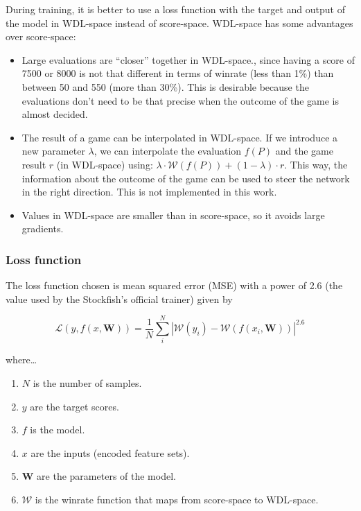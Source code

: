 During training, it is better to use a loss function with the target and output of the model in WDL-space instead of score-space. WDL-space has some advantages over score-space:

\begin{itemize}
\item Large evaluations are \enquote{closer} together in WDL-space., since having a score of 7500 or 8000 is not that different in terms of winrate (less than 1\%) than between 50 and 550 (more than 30\%). This is desirable because the evaluations don't need to be that precise when the outcome of the game is almost decided.
\item The result of a game can be interpolated in WDL-space. If we introduce a new parameter $\lambda$, we can interpolate the evaluation $f(P)$ and the game result $r$ (in WDL-space) using: $\lambda \cdot \mathcal{W}(f(P)) + (1 - \lambda) \cdot r$. This way, the information about the outcome of the game can be used to steer the network in the right direction. This is not implemented in this work.
\item Values in WDL-space are smaller than in score-space, so it avoids large gradients.
\end{itemize}




\subsubsection{Loss function}

The loss function chosen is mean squared error (MSE) with a power of 2.6 (the value used by the Stockfish's official trainer) given by


\[
\mathcal{L}(y,f(x,\bm{W}))= \frac{1}{N} \sum_i^N \left| \mathcal{W}(y_i) - \mathcal{W}(f(x_i,\bm{W})) \right| ^{2.6}
\]

where\dots

\begin{enumerate}
\itemsep0em
\item $N$ is the number of samples.
\item $y$ are the target scores.
\item $f$ is the model.
\item $x$ are the inputs (encoded feature sets).
\item $\bm{W}$ are the parameters of the model.
\item $\mathcal{W}$ is the winrate function that maps from score-space to WDL-space.
\end{enumerate}

